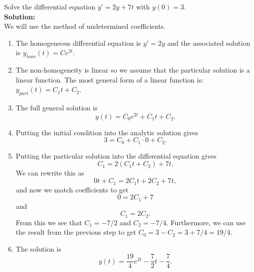 \begin{example}
    Solve the differential equation $y' = 2y + 7t$ with $y(0) = 3$. \\{\bf Solution:}\\ We
    will use the method of undetermined coefficients.  
    \begin{enumerate}
        \item The homogeneous differential equation is $y' = 2y$ and the associated
            solution is $y_{hom}(t) = Ce^{2t}$.  
        \item The non-homogeneity is linear so we assume that the particular solution is a
            linear function.  The most general form of a linear function is: $y_{part}(t)
            = C_1 t + C_2$.
        \item The full general solution is
            \[ y(t) = C_0 e^{2t} + C_1 t + C_2. \]
        \item Putting the initial condition into the analytic solution gives 
            \[ 3 = C_0 + C_1 \cdot 0 + C_2. \]
        \item Putting the particular solution into the differential equation gives
            \[ C_1 = 2(C_1t + C_2) + 7t. \]
            We can rewrite this as 
            \[ 0t + C_1 = 2C_1 t + 2C_2 + 7t, \]
            and now we match coefficients to get
            \[ 0 = 2C_1 + 7 \]
            and 
            \[ C_1 = 2C_2. \]
            From this we see that $C_1 = -7/2$ and $C_2 = -7/4.$  Furthermore, we can use
            the result from the previous step to get $C_0 = 3 - C_2 = 3 + 7/4 = 19/4.$
        \item The solution is
            \[ y(t) = \frac{19}{4} e^{2t} - \frac{7}{2} t - \frac{7}{4}. \]
    \end{enumerate}
\end{example}

